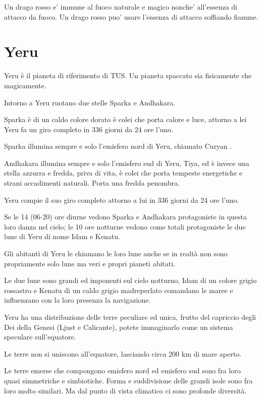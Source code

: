 \documentclass[a4paper,11pt,twoside,openany]{book}
\begin{document}
Un drago rosso e' immune al fuoco naturale e magico nonche' all'essenza di attacco da fuoco.
Un drago rosso puo' usare l'essenza di attacco soffiando fiamme.



\pagebreak

\section{Yeru}

\label{yeru}

Yeru è il pianeta di riferimento di TUS. Un pianeta spaccato sia fisicamente che magicamente.

Intorno a Yeru ruotano due stelle Sparka e Andhakara.

Sparka è di un caldo colore dorato è colei che porta calore e luce, attorno a lei Yeru fa un giro completo in 336 giorni da 24 ore l'uno.

Sparka illumina sempre e solo l'emisfero nord di Yeru, chiamato Curyan .

Andhakara illumina sempre e solo l'emisfero sud di Yeru, Tiya, ed è invece una stella azzurra e fredda, priva di vita, è colei che porta tempeste energetiche e strani accadimenti naturali. Porta una fredda penombra.

Yeru compie il suo giro completo attorno a lui in 336 giorni da 24 ore l'uno.

Se le 14 (06-20) ore diurne vedono Sparka e Andhakara protagoniste in questa loro danza nel cielo; le 10 ore notturne vedono come totali protagoniste le due lune di Yeru di nome Idam e Kenatu.

Gli abitanti di Yeru le chiamano le loro lune anche se in realtà non sono propriamente solo lune ma veri e propri pianeti abitati.

Le due lune sono grandi ed imponenti sul cielo notturno, Idam di un colore grigio rossastro e Kenatu di un caldo grigio madreperlato comandano le maree e influenzano con la loro presenza la navigazione.

Yeru ha una distribuzione delle terre peculiare ed unica, frutto del capriccio degli Dei della Genesi (Ljust e Calicante), potete immaginarlo come un sistema speculare sull'equatore.

Le terre non si uniscono all'equatore, lasciando circa 200 km di mare aperto.

Le terre emerse che compongono emisfero nord ed emisfero sud sono fra loro quasi simmetriche e simbiotiche. Forma e suddivisione delle grandi isole sono fra loro molto similari. Ma dal punto di vista climatico ci sono profonde diversità.
\end{document}

